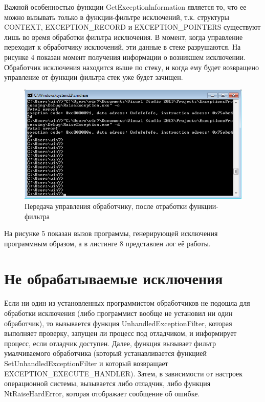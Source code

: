 \documentclass[a4paper, 12pt]{report}		%
\begin{document}
Важной особенностью функции GetExceptionlnformation является то, что ее можно вызывать только в функции-фильтре исключений, т.к. структуры CONTEXT, EXCEPTION\_RECORD и EXCEPTION\_POINTERS существуют лишь во время обработки фильтра исключения. В момент, когда управление переходит к обработчику исключений, эти данные в стеке разрушаются. На рисунке 4 показан момент получения информации о возникшем исключении. Обработчик исключения находится выше по стеку, и когда ему будет возвращено управление от функции фильтра стек уже будет зачищен.

\begin{figure}[h!]
\centering
\includegraphics[scale=0.95]{res/004}
\caption{Передача управления обработчику, после отработки функции-фильтра}
\end{figure}

На рисунке 5 показан вызов программы, генерирующей исключения программным образом, а в листинге 8 представлен лог её работы.




\chapter*{Не обрабатываемые исключения}

Если ни один из установленных программистом обработчиков не подошла для обработки исключения (либо программист вообще не установил ни один обработчик), то вызывается функция UnhandledExceptionFilter, которая выполняет проверку, запущен ли процесс под отладчиком, и информирует процесс, если отладчик доступен. Далее, функция вызывает фильтр умалчиваемого обработчика (который устанавливается функцией SetUnhandledExceptionFilter и который возвращает EXCEPTION\_EXECUTE\_HANDLER). Затем, в зависимости от настроек операционной системы, вызывается либо отладчик, либо функция NtRaiseHardError, которая отображает сообщение об ошибке. 
\end{document}
